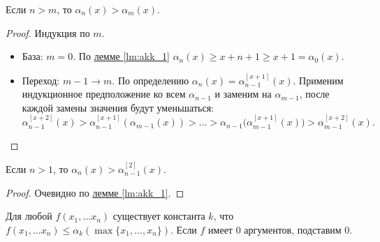 \begin{lm}\label{lm:akk_3}
	Если $ n > m$, то $  \alpha _n(x) > \alpha _m(x)$.
\end{lm}
\begin{proof}
    Индукция по $ m$.
	\begin{itemize}
		\item База: $ m=0$. По \hyperref[lm:akk_1]{лемме \ref{lm:akk_1}} $ \alpha _{n}(x) \ge x + n + 1 \ge  x + 1 = \alpha _0(x)$. 
		\item Переход: $ m -1 \to  m$. По определению $  \alpha _n(x) = \alpha _{n-1}^{[x+1]}(x)$. Применим индукционное предположение ко всем $ \alpha _{n-1}$  и  заменим на $ \alpha _{m-1}$, после каждой замены значения будут уменьшаться:
			\[
				\alpha _{n-1}^{[x+2]}(x) > \alpha _{n-1}^{[x+1]}( \alpha _{m-1}(x)) > \ldots > \alpha _{n-1}\bigl( \alpha _{m-1}^{[x+1]}(x) \bigr) > \alpha _{m-1}^{[x+2]}(x)
			.\] 
	\end{itemize}
\end{proof}
\begin{lm}\label{lm:akk_4}
	Если $ n > 1$, то $  \alpha _{n}(x) > \alpha _{n-1}^{[2]}(x)$.
\end{lm}
\begin{proof}
    Очевидно по \hyperref[lm:akk_1]{лемме \ref{lm:akk_1}}. 
\end{proof}
\begin{lm}\label{lm:akk_5}
	Для любой \prf $ f(x_1, \ldots x_n)$ существует константа $ k$, что $ f(x_1, \ldots x_{n}) \le \alpha _k( \max \{x_1, \ldots, x_{n}\})$. Если $ f$ имеет 0 аргументов, подставим  $ 0$.
\end{lm}
